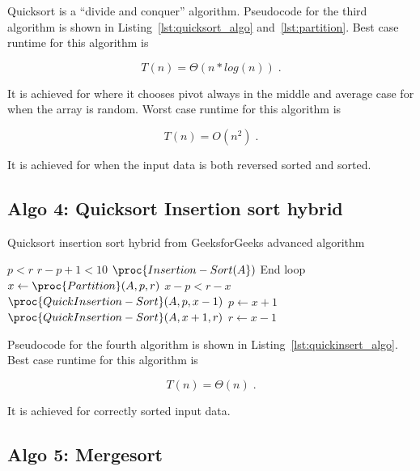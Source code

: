 Quicksort is a “divide and conquer” algorithm.
Pseudocode for the third algorithm is shown in
Listing~\ref{lst:quicksort_algo} and~\ref{lst:partition}. Best case runtime for this algorithm is

\begin{equation}
  T(n) = \Theta(n*log(n)) \;.  \label{eq:quick_sort_best}
\end{equation}

It is achieved for where it chooses pivot always in the middle and average case for when the array is random. Worst case runtime for this algorithm is

\begin{equation}
  T(n) = O(n^2) \;.  \label{eq:quick_sort_worst}
\end{equation}

It is achieved for when the input data is both reversed sorted and sorted.

\subsection{Algo 4: Quicksort Insertion sort hybrid}\label{sec:algo4}

\begin{algorithm}[H]
  \caption{Quicksort insertion sort hybrid from GeeksforGeeks advanced algorithm}
  \label{lst:quickinsert_algo}
  \begin{codebox}
    \li \While $p<r$
    \li	\Do \If $r-p+1<10$
    \li		\Do $\proc{Insertion-Sort(A})$
    \li			End loop
    \li 	\Else
    \li			$x \gets \proc{Partition}(A, p, r)$
    \li 	\If $x-p<r-x$
    \li		\Do $\proc{QuickInsertion-Sort}(A, p, x-1)$
    \li 	$p \gets x+1$
    \li 	\Else
    \li 	$\proc{QuickInsertion-Sort}(A, x+1, r)$
    \li 	$r \gets x-1$
    \End
    \End
    \End
  \end{codebox}
\end{algorithm}

Pseudocode for the fourth algorithm is shown in
Listing~\ref{lst:quickinsert_algo}. Best case runtime for this algorithm
is

\begin{equation}
  T(n) = \Theta(n) \;.  \label{eq:quick_sort_best}
\end{equation}

It is achieved for correctly sorted input data.

\subsection{Algo 5: Mergesort}\label{sec:algo5}

